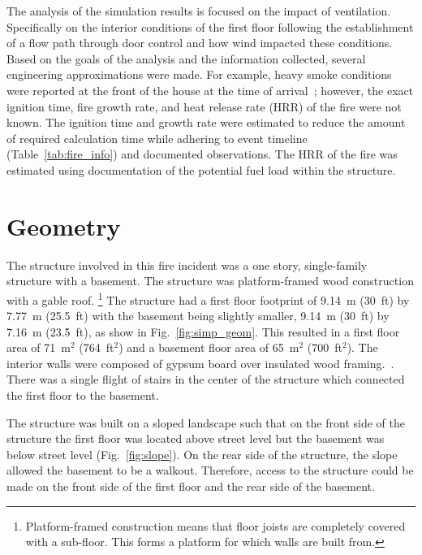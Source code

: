 \documentclass[12pt,oneside]{book}
\begin{document}
The analysis of the simulation results is focused on the impact of ventilation. Specifically on the  interior conditions of the first floor following the establishment of a flow path through door control and how wind impacted these conditions. Based on the goals of the analysis and the information collected, several engineering approximations were made. For example, heavy smoke conditions were reported at the front of the house at the time of arrival~\cite{PGCounty2013}; however, the exact ignition time, fire growth rate, and heat release rate (HRR) of the fire were not known. The ignition time and growth rate were estimated to reduce the amount of required calculation time while adhering to event timeline (Table~\ref{tab:fire_info}) and documented observations. The HRR of the fire was estimated using documentation of the potential fuel load within the structure.

\section{Geometry}
\label{geom}
The structure involved in this fire incident was a one story, single-family structure with a basement. The structure was platform-framed wood construction with a gable roof. \footnote{Platform-framed construction means that floor joists are completely covered with a sub-floor. This forms a platform for which walls are built from.} The structure had a first floor footprint of 9.14~m (30~ft) by 7.77~m (25.5~ft) with the basement being slightly smaller, 9.14~m (30~ft) by 7.16~m (23.5~ft), as show in Fig.~\ref{fig:simp_geom}. This resulted in a first floor area of 71~m$^2$ (764~ft$^2$) and a basement floor area of 65~m$^2$ (700~ft$^2$). The interior walls were composed of gypsum board over insulated wood framing.~\cite{PGCounty2013}. There was a single flight of stairs in the center of the structure which connected the first floor to the basement. 

The structure was built on a sloped landscape such that on the front side of the structure the first floor was located above street level but the basement was below street level (Fig.~\ref{fig:slope}). On the rear side of the structure, the slope allowed the basement to be a walkout. Therefore, access to the structure could be made on the front side of the first floor and the rear side of the basement.
\end{document}
